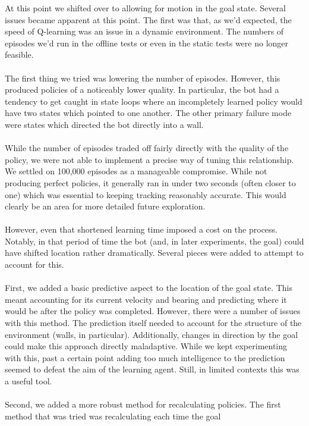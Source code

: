 \documentclass{aiaa-tc}%
\begin{document}
At this point we shifted over to allowing for motion in the goal
state. Several issues became apparent at this point. The first was that, as we'd expected, the
speed of Q-learning was an issue in a dynamic environment. The numbers
of episodes we'd run in the offline tests or even in the
static tests were no
longer feasible.  \\ \\
The first thing we tried was lowering the number of episodes. 
However, this produced policies of a noticeably lower quality. In
particular, the bot had a tendency to get caught in state loops where
an incompletely learned policy would have two states which pointed to
one another. The other primary failure mode were states which directed
the bot directly into a wall. \\ \\
While the number of episodes traded off fairly directly with
the quality of the policy, we were not able to implement a
precise way of tuning this relationship. We settled on 100,000 episodes as a manageable
compromise. While not producing perfect policies, it generally ran in under two
seconds (often closer to one) which was essential to
keeping tracking reasonably accurate. This would clearly be an area
for more detailed future exploration. \\ \\
However, even that shortened learning time imposed a cost on the process. Notably, in
that period of time the bot (and, in later experiments, the goal)
could have shifted location rather dramatically. Several pieces were
added to attempt to account for this. \\ \\
First, we added a basic predictive aspect to the location of the goal
state. This meant accounting for its current velocity and bearing and
predicting where it would be after the policy was completed. However,
there were a number of issues with this method. The prediction itself
needed to account for the structure of the environment (walls, in
particular). Additionally, changes in direction by the goal could make
this approach directly maladaptive. While we kept experimenting with
this, past a certain point adding too much intelligence to the
prediction seemed to defeat the aim of the learning agent. Still, in
limited contexts this was a useful tool. \\ \\
Second, we added a more robust method for recalculating policies. The
first method that was tried was recalculating each time the goal
\end{document}
